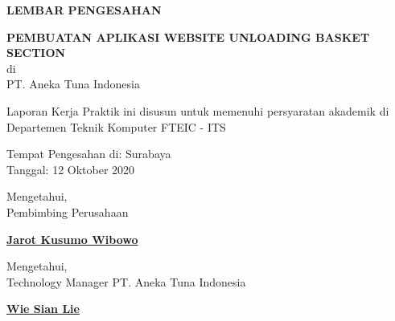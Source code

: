 \begin{center}
  {\Large \textbf{LEMBAR PENGESAHAN}}
  \vspace{4ex}


  {\large \textbf{PEMBUATAN APLIKASI WEBSITE UNLOADING BASKET SECTION}} \\
  di \\
  PT. Aneka Tuna Indonesia
  \vspace{4ex}

  Laporan Kerja Praktik ini disusun untuk memenuhi persyaratan akademik di Departemen Teknik Komputer FTEIC - ITS
  \vspace{2ex}

  Tempat Pengesahan di: Surabaya \\
  Tanggal: 12 Oktober 2020
  \vspace{8ex}

  Mengetahui, \\
  Pembimbing Perusahaan
  \vspace{12ex}

  \textbf{\underline{Jarot Kusumo Wibowo}}
  \vspace{8ex}

  Mengetahui, \\
  Technology Manager PT. Aneka Tuna Indonesia
  \vspace{12ex}

  \textbf{\underline{Wie Sian Lie}}

\end{center}
